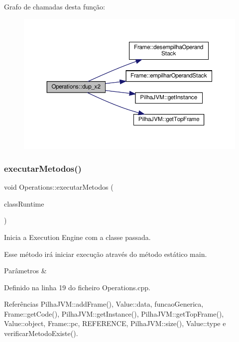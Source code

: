 Grafo de chamadas desta função\+:
\nopagebreak
\begin{figure}[H]
\begin{center}
\leavevmode
\includegraphics[width=350pt]{classOperations_adbba871c60bfb34344f2012936beeb25_cgraph}
\end{center}
\end{figure}
\mbox{\label{classOperations_ab771bdb83af6f55d93d126b944d4e73b}} 
\subsubsection{\texorpdfstring{executar\+Metodos()}{executarMetodos()}}
{\footnotesize\ttfamily void Operations\+::executar\+Metodos (\begin{DoxyParamCaption}\item[{\hyperlink{classStaticClass}{Static\+Class} $\ast$}]{class\+Runtime }\end{DoxyParamCaption})}



Inicia a Execution Engine com a classe passada. 

Esse método irá iniciar execução através do método estático main. 
\begin{DoxyParams}{Parâmetros}
{\em } & \\
\hline
\end{DoxyParams}


Definido na linha 19 do ficheiro Operations.\+cpp.



Referências Pilha\+J\+V\+M\+::add\+Frame(), Value\+::data, funcao\+Generica, Frame\+::get\+Code(), Pilha\+J\+V\+M\+::get\+Instance(), Pilha\+J\+V\+M\+::get\+Top\+Frame(), Value\+::object, Frame\+::pc, R\+E\+F\+E\+R\+E\+N\+CE, Pilha\+J\+V\+M\+::size(), Value\+::type e verificar\+Metodo\+Existe().



